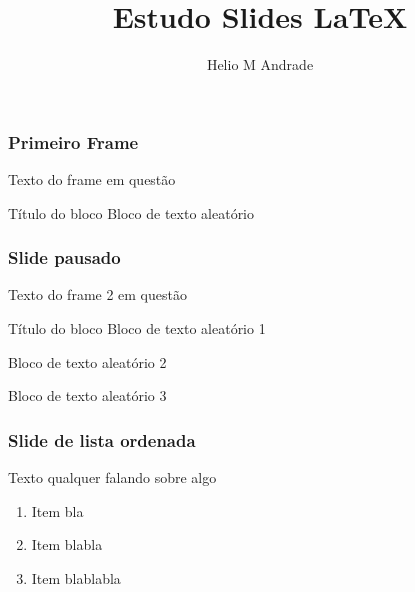 \documentclass[14pt]{beamer}
\begin{document}
	\author{Helio M Andrade}
	\title{Estudo Slides LaTeX}
	
	\begin{frame}[plain] %
		\maketitle %
	\end{frame}
	
	\begin{frame}
		\frametitle{Primeiro Frame}
		Texto do frame em questão
		
		\begin{block}{Título do bloco}
			Bloco de texto aleatório
		\end{block}
	\end{frame}
	
	\begin{frame}
		\frametitle{Slide pausado}
		Texto do frame 2 em questão
		
		\begin{block}{Título do bloco}
			Bloco de texto aleatório 1 \pause
			
			Bloco de texto aleatório 2 \pause
			
			Bloco de texto aleatório 3 
		\end{block}
	\end{frame}
	
	\begin{frame}
		\frametitle{Slide de lista ordenada}
		Texto qualquer falando sobre algo
		\begin{enumerate}[<+->] %
			\item Item bla 
			\item Item blabla 
			\item Item blablabla
		\end{enumerate}
	\end{frame}
\end{document}
